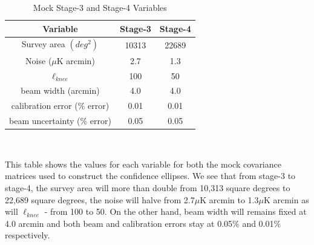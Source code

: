 \begin{table}[h]
\centering
\caption{Mock Stage-3 and Stage-4 Variables}

\label{table: stage-stats}
\begin{tabular}{l|l|l}
\multicolumn{1}{c}{Variable} & \multicolumn{1}{|c}{Stage-3} & \multicolumn{1}{|c}{Stage-4} \\ \hline
\multicolumn{1}{c}{Survey area $(deg^2)$} & \multicolumn{1}{|c}{10313} & \multicolumn{1}{|c}{22689}  \\
\multicolumn{1}{c}{Noise ($\mu$K arcmin)} & \multicolumn{1}{|c}{2.7} & \multicolumn{1}{|c}{1.3}  \\
\multicolumn{1}{c}{$\ell_{knee}$} & \multicolumn{1}{|c}{100} & \multicolumn{1}{|c}{50} \\
\multicolumn{1}{c}{beam width (arcmin)} & \multicolumn{1}{|c}{4.0} & \multicolumn{1}{|c}{4.0}   \\
\multicolumn{1}{c}{calibration error (\% error)} & \multicolumn{1}{|c}{0.01} & \multicolumn{1}{|c}{0.01} \\
\multicolumn{1}{c}{beam uncertainty (\% error)} & \multicolumn{1}{|c}{0.05} & \multicolumn{1}{|c}{0.05}
\end{tabular}
\\
\begin{flushleft}
This table shows the values for each variable for both the mock covariance matrices used to construct the confidence ellipses. We see that from stage-3 to stage-4, the survey area will more than double from 10,313 square degrees to 22,689 square degrees, the noise will halve from 2.7$\mu$K arcmin to 1.3$\mu$K arcmin as will $\ell_{knee}$ - from 100 to 50. On the other hand, beam width will remains fixed at 4.0 arcmin and both beam and calibration errors stay at 0.05$\%$ and 0.01$\%$ respectively.
\end{flushleft}
\end{table}

